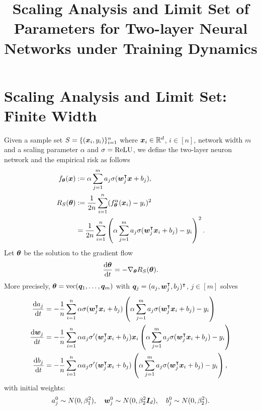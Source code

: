 \documentclass{article}
\begin{document}
\title{Scaling Analysis and Limit Set of Parameters for Two-layer Neural Networks under Training Dynamics}
\author{}

\maketitle
\begin{abstract}

\end{abstract}

\section{Scaling Analysis and Limit Set: Finite Width}
Given a sample set $S=\{(\bm{x}_i,y_i)\}_{i=1}^n$ where $\bm{x}_i\in\mathbb{R}^d$, $i\in[n]$, network width $m$ and a scaling parameter $\alpha$ and $\sigma=\mathrm{ReLU}$, we define the two-layer neuron network and the empirical risk as follows
\begin{align}
    f_{\bm{\theta}}(\bm{x})
     & := \alpha\sum_{j=1}^{m}a_j\sigma(\bm{w}_j^\intercal\bm{x}+b_j),                                            \\
    R_S(\bm{\theta})
     & :=\frac{1}{2n}\sum_{i=1}^n(f_{\bm{\theta}}^\alpha(\bm{x}_i)-y_i)^2                                   \\
     & =\frac{1}{2n}\sum_{i=1}^n\left(\alpha\sum_{j=1}^{m}a_j\sigma(\bm{w}_j^\intercal\bm{x}_i+b_j)-y_i\right)^2.
\end{align}
Let $\bm{\theta}$ be the solution to the gradient flow
\begin{equation}
    \frac{\mathrm{d} \bm{\theta}}{\mathrm{d} t}=-\nabla_{\bm{\theta}}R_S(\bm{\theta}).
\end{equation}
More precisely, $\bm{\theta}=\mathrm{vec}(\bm{q}_1,\ldots,\bm{q}_m)$ with $\bm{q}_j=(a_j,\bm{w}_j^{\intercal},b_j)^\intercal$, $j\in[m]$ solves
\begin{align*}
    \frac{\mathrm{d} a_j}{\mathrm{d} t}
     & = -\frac{1}{n}\sum_{i=1}^n\alpha\sigma(\bm{w}_j^{\intercal}\bm{x}_i+b_j) \left(\alpha\sum_{j=1}^{m}a_j\sigma(\bm{w}_j^{\intercal}\bm{x}_i+b_j)-y_i\right)           \\
    \frac{\mathrm{d} \bm{w}_j}{\mathrm{d} t}
     & = -\frac{1}{n}\sum_{i=1}^n\alpha a_j\sigma'(\bm{w}_j^{\intercal}\bm{x}_i+b_j)\bm{x}_i \left(\alpha\sum_{j=1}^{m}a_j\sigma(\bm{w}_j^{\intercal}\bm{x}_i+b_j)-y_i\right) \\
    \frac{\mathrm{d} b_j}{\mathrm{d} t}
     & = -\frac{1}{n}\sum_{i=1}^n\alpha a_j\sigma'(\bm{w}_j^{\intercal}\bm{x}_i+b_j) \left(\alpha\sum_{j=1}^{m}a_j\sigma(\bm{w}_j^{\intercal}\bm{x}_i+b_j)-y_i\right),
\end{align*}
with initial weights:
\begin{equation}
    a_j^0\sim N(0, \beta_1^2), \quad \bm{w}_j^0\sim N(0, \beta_2^2 \bm{I}_d), \quad b_j^0\sim N(0, \beta_2^2).
\end{equation}
\end{document}
